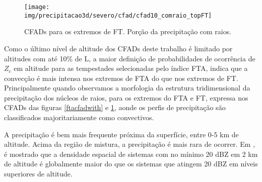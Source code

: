 
\begin{figure}[!ht]
  \centering
  \texttt{[image: img/precipitacao3d/severo/cfad/cfad10\_comraio\_topFT]}
  \caption{CFADs para os extremos de FT. Porção da precipitação com raios.}
  \label{ftcfadwith}   
\end{figure} 


Como o último nível de altitude dos CFADs deste trabalho é limitado por altitudes com até 10\% de L, a maior definição de probabilidades de ocorrência de $Z_c$ em altitude para as tempestades selecionadas pelo índice FTA, indica que a convecção é mais intensa nos extremos de FTA do que nos extremos de FT. Principalmente quando observamos a morfologia da estrutura tridimensional da precipitação dos núcleos de raios, para os extremos do FTA e FT, expressa nos CFADs das figuras \ref{ftacfadwith} e \ref{ftcfadwith}, aonde os perfis de precipitação são classificados majoritariamente como convectivos.

A precipitação é bem mais frequente próxima da superfície, entre 0-5 km de altitude. Acima da região de mistura, a precipitação é mais rara de ocorrer. Em \cite{liu2008}, é mostrado que a densidade espacial de sistemas com no mínimo 20 dBZ em 2 km de altitude é globalmente maior do que os sistemas que atingem 20 dBZ em níveis superiores de altitude.



